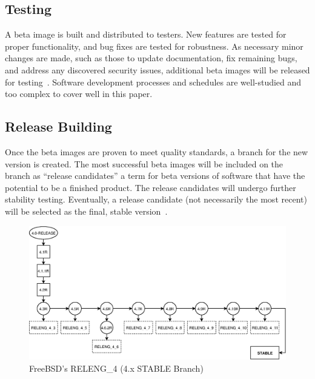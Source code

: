 \documentclass[conference]{IEEEtran}
\begin{document}
\subsection{Testing}
A beta image is built and distributed to testers.
New features are tested for proper functionality, and bug fixes are tested for robustness.
As necessary minor changes are made, such as those to update documentation,
fix remaining bugs, and address any discovered security issues,
additional beta images will be released for testing~\cite{freebsdrelease}.
Software development processes and schedules are well-studied and too complex to cover well in this
paper.

\subsection{Release Building}
Once the beta images are proven to meet quality standards,
a branch for the new version is created.
The most successful beta images will be included on the branch
as ``release candidates'' a term for beta versions of software
that have the potential to be a finished product.
The release candidates will undergo further stability testing.
Eventually, a release candidate (not necessarily the most recent) will
be selected as the final, stable version~\cite{freebsdrelease}.

\begin{figure}[h!]
\includegraphics[width=\linewidth]{./images/FreeBSD_4.eps}
\caption{FreeBSD's RELENG\_4 (4.x STABLE Branch)}
\label{FreeBSD_4}
\end{figure}
\end{document}
